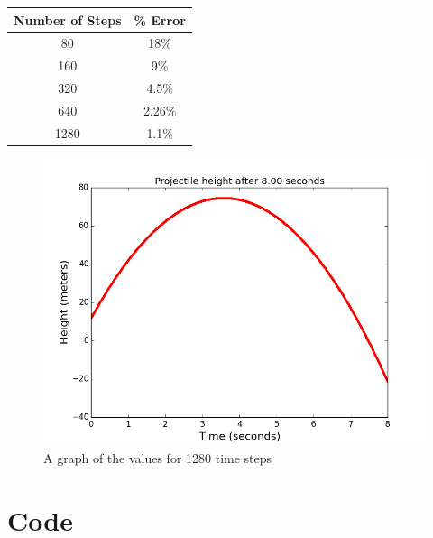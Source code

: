 \documentclass[11pt]{article}
\begin{document}
\begin{center}
 \begin{tabular}{||c c||} 
 \hline
 Number of Steps & \% Error  \\ [0.5ex] 
 \hline\hline
 80 & 18\%  \\ 
 \hline
 160 & 9\%  \\
 \hline
 320 & 4.5\%  \\
 \hline
 640 & 2.26\%  \\
 \hline
 1280 & 1.1\%  \\ [1ex] 
 \hline
\end{tabular}
\end{center} 

\begin{figure}
\centering
\includegraphics[scale=.5]{trial_1280.png}
\caption{A graph of the values for 1280 time steps}
\end{figure}
\section{Code}
\end{document}
